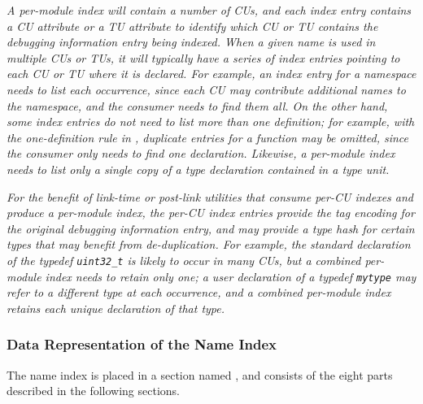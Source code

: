 \textit{A per-module index will contain a number of CUs, and each index 
entry contains a CU attribute or a TU attribute to identify which 
CU or TU contains the debugging information entry being indexed. When a
given name is used in multiple CUs or TUs, it will typically have a
series of index entries pointing to each CU or TU where it is declared. 
For example, an index entry for a  namespace needs to
list each occurrence, since each CU may contribute additional names to
the namespace, and the consumer needs to find them all. On the
other hand, some index entries do not need to list more than one
definition; for example, with the one-definition rule in ,
duplicate entries for a function may be omitted, since the consumer
only needs to find one declaration. Likewise, a per-module index needs
to list only a single copy of a type declaration contained in a type
unit.}

\textit{For the benefit of link-time or post-link utilities that consume
per-CU indexes and produce a per-module index, the per-CU index
entries provide the tag encoding for the original debugging
information entry, and may provide a type hash for certain types that
may benefit from de-duplication. For example, the standard declaration
of the typedef \texttt{uint32\_t} is likely to occur in many CUs, but a
combined per-module index needs to retain only one; a user declaration
of a typedef \texttt{mytype} may refer to a different type at each
occurrence, and a combined per-module index retains each unique
declaration of that type.}


\subsubsection{Data Representation of the Name Index}
\label{chap:datarepresentationofthenameindex}
The name index is placed in a section named \dotdebugnames, and
consists of the eight parts described in the following sections.

